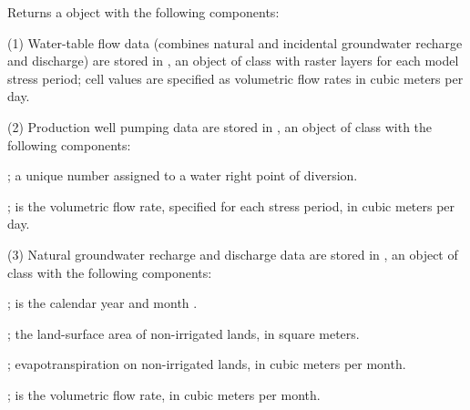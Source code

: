 \documentclass[letterpaper]{book}
\begin{document}
%
\begin{Value}
Returns a  object with the following components:

(1) Water-table flow data (combines natural and incidental groundwater recharge and discharge) are stored in ,
an object of  class with raster layers for each model stress period;
cell values are specified as volumetric flow rates in cubic meters per day.

(2) Production well pumping data are stored in , an object of  class with the following components:
\begin{ldescription}
\item[\code{WMISNumber}] ; a unique number assigned to a water right point of diversion.
\item[\code{ss, 199501, ..., 201012}] ; is the volumetric flow rate, specified for each stress period, in cubic meters per day.

\end{ldescription}
(3) Natural groundwater recharge and discharge data are stored in , an object of  class with the following components:
\begin{ldescription}
\item[\code{YearMonth}] ; is the calendar year and month .
\item[\code{Area}] ; the land-surface area of non-irrigated lands, in square meters.
\item[\code{ET}] ; evapotranspiration on non-irrigated lands, in cubic meters per month.
\item[\code{Rech}] ; is the volumetric flow rate, in cubic meters per month.


\end{ldescription}
\end{Value}
\end{document}
